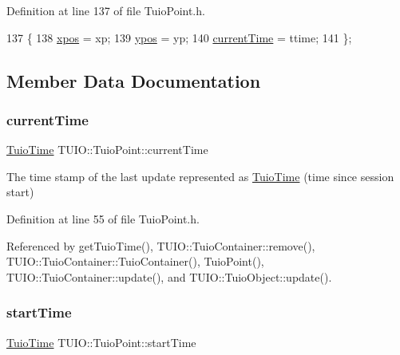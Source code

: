 Definition at line 137 of file Tuio\+Point.\+h.


\begin{DoxyCode}
137                                                          \{
138             \hyperlink{class_t_u_i_o_1_1_tuio_point_a0021f8dfddd05f2a17e713a94f5457e6}{xpos} = xp;
139             \hyperlink{class_t_u_i_o_1_1_tuio_point_a89a038775a681166168735dbc95c7779}{ypos} = yp;
140             \hyperlink{class_t_u_i_o_1_1_tuio_point_ad04658d52ab78e3e0ddc21584ceaa2ff}{currentTime} = ttime;
141         \};
\end{DoxyCode}


\subsection{Member Data Documentation}
\mbox{\label{class_t_u_i_o_1_1_tuio_point_ad04658d52ab78e3e0ddc21584ceaa2ff}} 
\subsubsection{\texorpdfstring{current\+Time}{currentTime}}
{\footnotesize\ttfamily \hyperlink{class_t_u_i_o_1_1_tuio_time}{Tuio\+Time} T\+U\+I\+O\+::\+Tuio\+Point\+::current\+Time\hspace{0.3cm}{\ttfamily [protected]}}

The time stamp of the last update represented as \hyperlink{class_t_u_i_o_1_1_tuio_time}{Tuio\+Time} (time since session start) 

Definition at line 55 of file Tuio\+Point.\+h.



Referenced by get\+Tuio\+Time(), T\+U\+I\+O\+::\+Tuio\+Container\+::remove(), T\+U\+I\+O\+::\+Tuio\+Container\+::\+Tuio\+Container(), Tuio\+Point(), T\+U\+I\+O\+::\+Tuio\+Container\+::update(), and T\+U\+I\+O\+::\+Tuio\+Object\+::update().

\mbox{\label{class_t_u_i_o_1_1_tuio_point_ac69cfb9784d5fdc966fba57459d1d8e5}} 
\subsubsection{\texorpdfstring{start\+Time}{startTime}}
{\footnotesize\ttfamily \hyperlink{class_t_u_i_o_1_1_tuio_time}{Tuio\+Time} T\+U\+I\+O\+::\+Tuio\+Point\+::start\+Time\hspace{0.3cm}{\ttfamily [protected]}}

